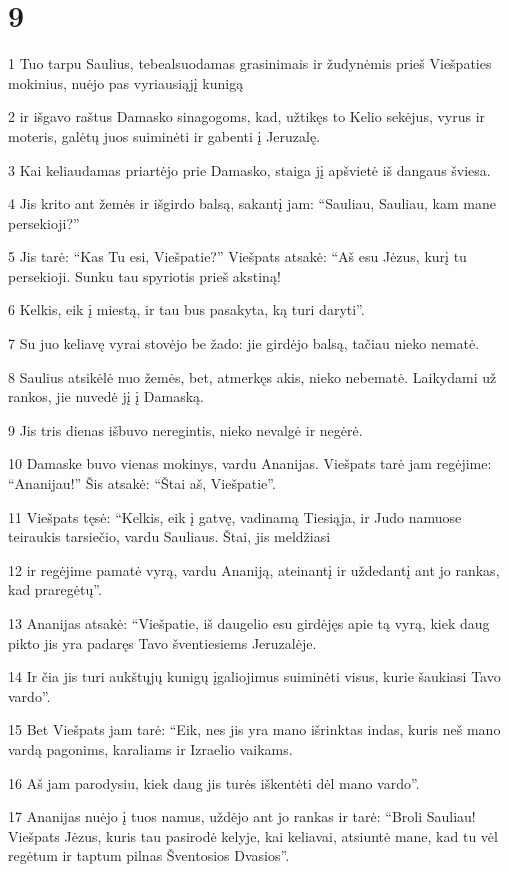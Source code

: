 \chapter{9}


\par 1 Tuo tarpu Saulius, tebealsuodamas grasinimais ir žudynėmis prieš Viešpaties mokinius, nuėjo pas vyriausiąjį kunigą 
\par 2 ir išgavo raštus Damasko sinagogoms, kad, užtikęs to Kelio sekėjus, vyrus ir moteris, galėtų juos suiminėti ir gabenti į Jeruzalę. 
\par 3 Kai keliaudamas priartėjo prie Damasko, staiga jį apšvietė iš dangaus šviesa. 
\par 4 Jis krito ant žemės ir išgirdo balsą, sakantį jam: “Sauliau, Sauliau, kam mane persekioji?” 
\par 5 Jis tarė: “Kas Tu esi, Viešpatie?” Viešpats atsakė: “Aš esu Jėzus, kurį tu persekioji. Sunku tau spyriotis prieš akstiną! 
\par 6 Kelkis, eik į miestą, ir tau bus pasakyta, ką turi daryti”. 
\par 7 Su juo keliavę vyrai stovėjo be žado: jie girdėjo balsą, tačiau nieko nematė. 
\par 8 Saulius atsikėlė nuo žemės, bet, atmerkęs akis, nieko nebematė. Laikydami už rankos, jie nuvedė jį į Damaską. 
\par 9 Jis tris dienas išbuvo neregintis, nieko nevalgė ir negėrė. 
\par 10 Damaske buvo vienas mokinys, vardu Ananijas. Viešpats tarė jam regėjime: “Ananijau!” Šis atsakė: “Štai aš, Viešpatie”. 
\par 11 Viešpats tęsė: “Kelkis, eik į gatvę, vadinamą Tiesiąja, ir Judo namuose teiraukis tarsiečio, vardu Sauliaus. Štai, jis meldžiasi 
\par 12 ir regėjime pamatė vyrą, vardu Ananiją, ateinantį ir uždedantį ant jo rankas, kad praregėtų”. 
\par 13 Ananijas atsakė: “Viešpatie, iš daugelio esu girdėjęs apie tą vyrą, kiek daug pikto jis yra padaręs Tavo šventiesiems Jeruzalėje. 
\par 14 Ir čia jis turi aukštųjų kunigų įgaliojimus suiminėti visus, kurie šaukiasi Tavo vardo”. 
\par 15 Bet Viešpats jam tarė: “Eik, nes jis yra mano išrinktas indas, kuris neš mano vardą pagonims, karaliams ir Izraelio vaikams. 
\par 16 Aš jam parodysiu, kiek daug jis turės iškentėti dėl mano vardo”. 
\par 17 Ananijas nuėjo į tuos namus, uždėjo ant jo rankas ir tarė: “Broli Sauliau! Viešpats Jėzus, kuris tau pasirodė kelyje, kai keliavai, atsiuntė mane, kad tu vėl regėtum ir taptum pilnas Šventosios Dvasios”. 
